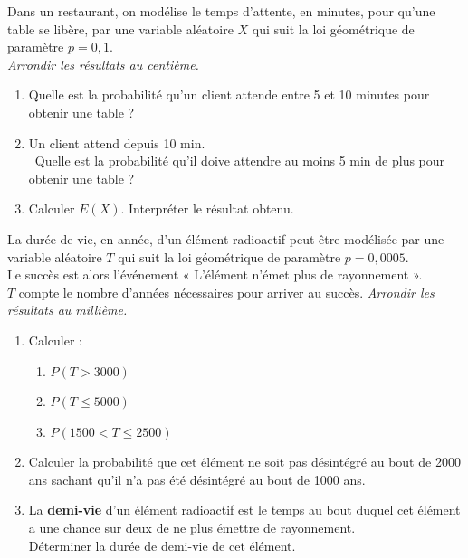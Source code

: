 \documentclass[a4paper,11pt,exos]{nsi} %
\begin{document}
\exo{}%
Dans un restaurant, on modélise le temps d'attente, en minutes, pour qu'une table se libère, par une variable aléatoire $X$ qui suit la loi géométrique de paramètre $p=0,1$.\\
\textit{Arrondir les résultats au centième.}
\begin{enumerate}
    \item Quelle est la probabilité qu'un client attende entre 5 et 10 minutes pour obtenir une table ?
    \item Un client attend depuis 10 min.\\\
    Quelle est la probabilité qu'il doive attendre au moins 5 min de plus pour obtenir une table ?
    \item Calculer $E(X)$. Interpréter le résultat obtenu.
\end{enumerate}

\exo{}
La durée de vie, en année, d'un élément radioactif peut être modélisée par une variable aléatoire $T$ qui suit la loi géométrique de paramètre $p=0,000 5$.\\
Le succès est alors l'événement « L'élément n'émet plus de rayonnement ».\\
$T$ compte le nombre d'années nécessaires pour arriver au succès. \textit{Arrondir les résultats au millième.}
\begin{enumerate}
    \item Calculer :
    \begin{multicols}{3}
        \begin{enumerate}[label=\textbullet]
            \item $P(T>3000)$
            \item $P(T\leqslant 5000)$
            \item $P(1500<T\leqslant 2500)$
        \end{enumerate}
    \end{multicols}
    \item Calculer la probabilité que cet élément ne soit pas désintégré au bout de 2000 ans sachant qu'il n'a pas été désintégré au bout de 1000 ans.
    \item La \textbf{demi-vie} d'un élément radioactif est le temps au bout duquel cet élément a une chance sur deux de ne plus émettre de rayonnement.\\
    \faCalculator \hspace*{.2cm} Déterminer la durée de demi-vie de cet élément.
\end{enumerate}
\end{document}

